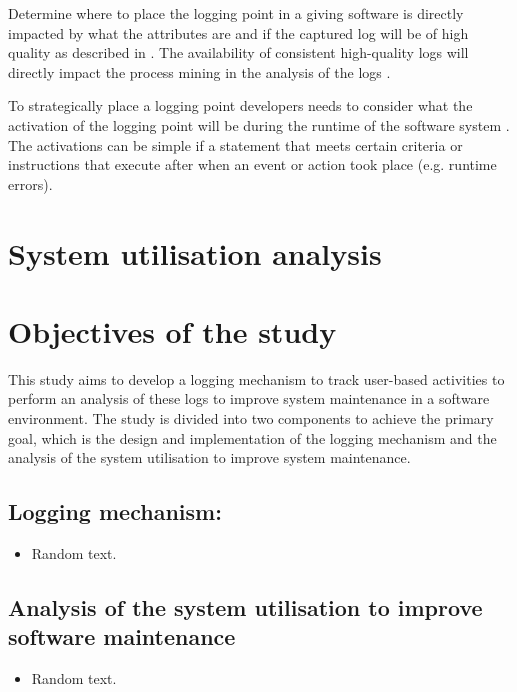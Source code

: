 Determine where to place the logging point in a giving software is directly impacted by what the attributes are and if the captured log will be of high quality as described in . The availability of consistent high-quality logs will directly impact the process mining in the analysis of the logs \cite{Kherbouche2017}.\par To strategically place a logging point developers needs to consider what the activation of the logging point will be during the runtime of the software system \cite{Pecchia2015, Cinque2013}. The activations can be simple if a statement that meets certain criteria or instructions that execute after when an event or action took place (e.g. runtime errors).

\clearpage

\section{System utilisation analysis}\label{sec:ch1_systemUtilisation}

\clearpage

\section{Objectives of the study}
This study aims to develop a logging mechanism to track user-based activities to perform an analysis of these logs to improve system maintenance in a software environment. The study is divided into two components to achieve the primary goal, which is the design and implementation of the logging mechanism and the analysis of the system utilisation to improve system maintenance.

\subsection{Logging mechanism:}
\begin{itemize}
	\item Random text.
\end{itemize}

\subsection{Analysis of the system utilisation to improve software maintenance}
\begin{itemize}
	\item Random text.
\end{itemize}

